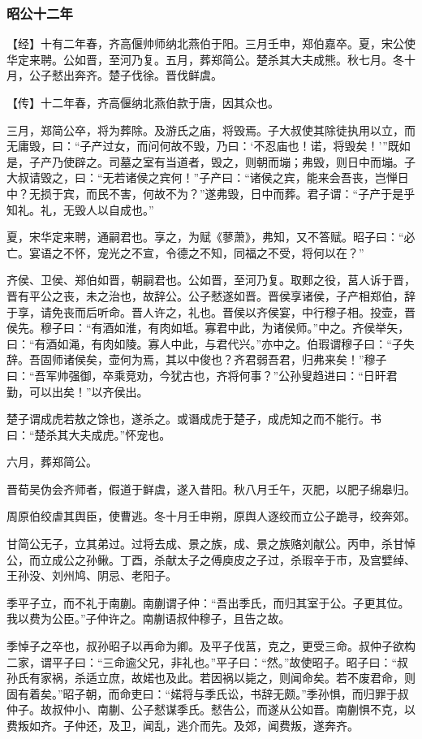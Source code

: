 \documentclass[]{article}
\begin{document}
\hypertarget{header-n2558}{%
\subsubsection{昭公十二年}\label{header-n2558}}

【经】十有二年春，齐高偃帅师纳北燕伯于阳。三月壬申，郑伯嘉卒。夏，宋公使华定来聘。公如晋，至河乃复。五月，葬郑简公。楚杀其大夫成熊。秋七月。冬十月，公子憖出奔齐。楚子伐徐。晋伐鲜虞。

【传】十二年春，齐高偃纳北燕伯款于唐，因其众也。

三月，郑简公卒，将为葬除。及游氏之庙，将毁焉。子大叔使其除徒执用以立，而无庸毁，曰：``子产过女，而问何故不毁，乃曰：`不忍庙也！诺，将毁矣！'''既如是，子产乃使辟之。司墓之室有当道者，毁之，则朝而塴；弗毁，则日中而塴。子大叔请毁之，曰：``无若诸侯之宾何！''子产曰：``诸侯之宾，能来会吾丧，岂惮日中？无损于宾，而民不害，何故不为？''遂弗毁，日中而葬。君子谓：``子产于是乎知礼。礼，无毁人以自成也。''

夏，宋华定来聘，通嗣君也。享之，为赋《蓼萧》，弗知，又不答赋。昭子曰：``必亡。宴语之不怀，宠光之不宣，令德之不知，同福之不受，将何以在？''

齐侯、卫侯、郑伯如晋，朝嗣君也。公如晋，至河乃复。取郠之役，莒人诉于晋，晋有平公之丧，未之治也，故辞公。公子憖遂如晋。晋侯享诸侯，子产相郑伯，辞于享，请免丧而后听命。晋人许之，礼也。晋侯以齐侯宴，中行穆子相。投壶，晋侯先。穆子曰：``有酒如淮，有肉如坻。寡君中此，为诸侯师。''中之。齐侯举矢，曰：``有酒如渑，有肉如陵。寡人中此，与君代兴。''亦中之。伯瑕谓穆子曰：``子失辞。吾固师诸侯矣，壶何为焉，其以中俊也？齐君弱吾君，归弗来矣！''穆子曰：``吾军帅强御，卒乘竞劝，今犹古也，齐将何事？''公孙叟趋进曰：``日旰君勤，可以出矣！''以齐侯出。

楚子谓成虎若敖之馀也，遂杀之。或谮成虎于楚子，成虎知之而不能行。书曰：``楚杀其大夫成虎。''怀宠也。

六月，葬郑简公。

晋荀吴伪会齐师者，假道于鲜虞，遂入昔阳。秋八月壬午，灭肥，以肥子绵皋归。

周原伯绞虐其舆臣，使曹逃。冬十月壬申朔，原舆人逐绞而立公子跪寻，绞奔郊。

甘简公无子，立其弟过。过将去成、景之族，成、景之族赂刘献公。丙申，杀甘悼公，而立成公之孙鳅。丁酉，杀献太子之傅庾皮之子过，杀瑕辛于市，及宫嬖绰、王孙没、刘州鸠、阴忌、老阳子。

季平子立，而不礼于南蒯。南蒯谓子仲：``吾出季氏，而归其室于公。子更其位。我以费为公臣。''子仲许之。南蒯语叔仲穆子，且告之故。

季悼子之卒也，叔孙昭子以再命为卿。及平子伐莒，克之，更受三命。叔仲子欲构二家，谓平子曰：``三命逾父兄，非礼也。''平子曰：``然。''故使昭子。昭子曰：``叔孙氏有家祸，杀适立庶，故婼也及此。若因祸以毙之，则闻命矣。若不废君命，则固有着矣。''昭子朝，而命吏曰：``婼将与季氏讼，书辞无颇。''季孙惧，而归罪于叔仲子。故叔仲小、南蒯、公子憖谋季氏。憖告公，而遂从公如晋。南蒯惧不克，以费叛如齐。子仲还，及卫，闻乱，逃介而先。及郊，闻费叛，遂奔齐。
\end{document}
